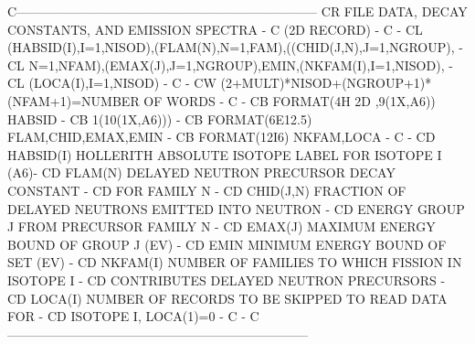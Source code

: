 \begin{ccode}
C-----------------------------------------------------------------------
CR          FILE DATA, DECAY CONSTANTS, AND EMISSION SPECTRA           -
C                             (2D RECORD)                              -
C                                                                      -
CL    (HABSID(I),I=1,NISOD),(FLAM(N),N=1,FAM),((CHID(J,N),J=1,NGROUP), -
CL    N=1,NFAM),(EMAX(J),J=1,NGROUP),EMIN,(NKFAM(I),I=1,NISOD),        -
CL    (LOCA(I),I=1,NISOD)                                              -
C                                                                      -
CW    (2+MULT)*NISOD+(NGROUP+1)*(NFAM+1)=NUMBER OF WORDS               -
C                                                                      -
CB    FORMAT(4H 2D ,9(1X,A6))          HABSID                          -
CB   1(10(1X,A6)))                                                     -
CB    FORMAT(6E12.5)                   FLAM,CHID,EMAX,EMIN             -
CB    FORMAT(12I6)                     NKFAM,LOCA                      -
C                                                                      -
CD    HABSID(I)     HOLLERITH ABSOLUTE ISOTOPE LABEL FOR ISOTOPE I (A6)-
CD    FLAM(N)       DELAYED NEUTRON PRECURSOR DECAY CONSTANT           -
CD                     FOR FAMILY N                                    -
CD    CHID(J,N)     FRACTION OF DELAYED NEUTRONS EMITTED INTO NEUTRON  -
CD                     ENERGY GROUP J FROM PRECURSOR FAMILY N          -
CD    EMAX(J)       MAXIMUM ENERGY BOUND OF GROUP J (EV)               -
CD    EMIN          MINIMUM ENERGY BOUND OF SET (EV)                   -
CD    NKFAM(I)      NUMBER OF FAMILIES TO WHICH FISSION IN ISOTOPE I   -
CD                     CONTRIBUTES DELAYED NEUTRON PRECURSORS          -
CD    LOCA(I)       NUMBER OF RECORDS TO BE SKIPPED TO READ DATA FOR   -
CD                     ISOTOPE I, LOCA(1)=0                            -
C                                                                      -
C-----------------------------------------------------------------------


\end{ccode}
